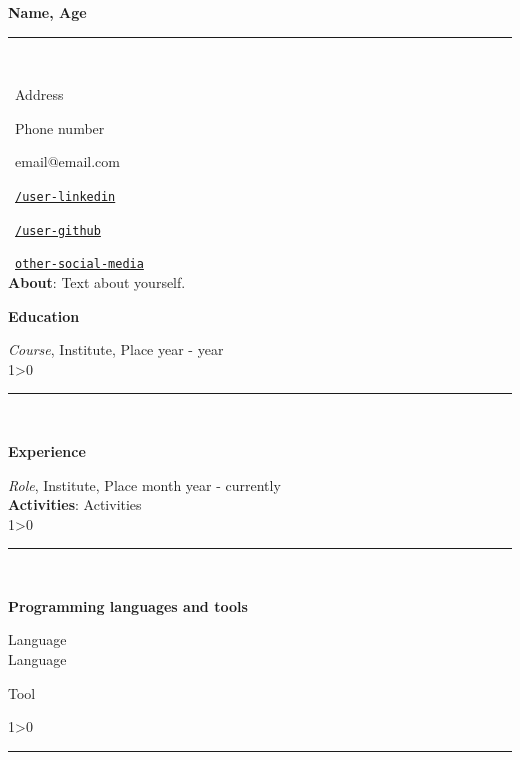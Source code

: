 \documentclass[a4paper,10pt]{article}
\makeatletter
\newcommand{\professional}{Name}
\newcommand{\age}{Age}
\newcommand{\address}{Address}
\newcommand{\phone}{Phone number}
\newcommand{\email}{email@email.com}
\newcommand{\about}{
    Text about yourself.
	\vspace{3\baselineskip}
}
\newcommand{\createSection}[4][0]{
    \noindent
	\begin{minipage}{0.16\linewidth}
		\large{\textbf{#2}}
		\vspace{#3\baselineskip}
	\end{minipage}
	\hfill
	\begin{minipage}{0.79\linewidth}
		#4
		\ifnum0#1>0 { \hrule {\ } } \fi
	\end{minipage}
	\vspace{\baselineskip}
}
\makeatother
\begin{document}
	\noindent
	\hfill
	\begin{minipage}{0.65\linewidth}
		\Huge{\bf \professional, \age}\\\vspace{-1.75\baselineskip}
		
		\noindent\rule{\textwidth}{1.5pt} {\ }\\\vspace{-1.8\baselineskip}
		
		\large{
		\faMapMarker \ \address \\
		\begin{minipage}{0.5\linewidth}
			\faWhatsapp \ \phone
		\end{minipage}
		\begin{minipage}{0.5\linewidth}
			\faEnvelope \ \email
		\end{minipage}
		\begin{minipage}{0.5\linewidth}
			\faLinkedinSquare \ \href{https://www.linkedin.com}{\texttt{/user-linkedin}}
		\end{minipage}
		\begin{minipage}{0.5\linewidth}
			\faGithub \ \href{https://github.com}{\texttt{/user-github}}
		\end{minipage}
		\faLink \ \href{https://www.overleaf.com/}{\texttt{other-social-media}}\\
		\vfill
		\textbf{About}:\about
		}
	\end{minipage}
	\vspace{\baselineskip}
	
    \createSection[1]{Education}{1}{
		\textit{Course}, Institute, Place \hfill year - year \\
	}
	
	\createSection[1]{Experience}{2}{
	    \textit{Role}, Institute, Place \hfill month year - currently \\
	    \textbf{Activities}: Activities\\
	}
    
    \createSection[1]{Programming languages and tools}{2}{
        \large{\bf
			\begin{minipage}{0.33\linewidth}
				Language\\
				Language\\
				\vspace{\baselineskip}
			\end{minipage}
			\begin{minipage}{0.33\linewidth}
				Tool\\
				\vspace{2\baselineskip}
			\end{minipage}
			\begin{minipage}{0.33\linewidth}
				\vspace{3\baselineskip}
			\end{minipage}
		}
    }
	
\end{document}

